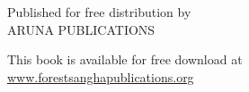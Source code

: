 
\mbox{}

\cleardoublepage

{\thispagestyle{empty}\Large%

\raggedleft\setlength{\parskip}{0.75em}\setlength{\parindent}{0em}

\vspace*{3\baselineskip}
{\fontGoudy\Large \thetitle}

\vfill

{\Small

Published for free distribution by\\
ARUNA PUBLICATIONS

This book is available for free download at\\
\href{http://www.forestsanghapublications.org/}{www.forestsanghapublications.org}

}

}
